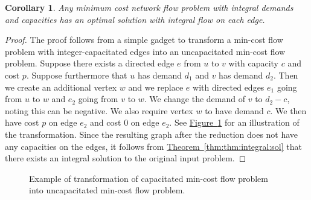 \documentclass[11pt]{article}
\newtheorem{corollary}[theorem]{Corollary}
\newcommand{\namedref}[2]{\hyperref[#2]{#1~\ref*{#2}}}
\newcommand{\thmref}[1]{\namedref{Theorem}{thm:#1}}
\newcommand{\corlab}[1]{\label{cor:#1}}
\newcommand{\figlab}[1]{\label{fig:#1}}
\newcommand{\figref}[1]{\namedref{Figure}{fig:#1}}
\begin{document}
\begin{corollary}
\corlab{cor:integral:sol}
Any minimum cost network flow problem with integral demands and capacities has an optimal solution with integral flow on each edge. 
\end{corollary}
\begin{proof}
The proof follows from a simple gadget to transform a min-cost flow problem with integer-capacitated edges into an uncapacitated min-cost flow problem. 
Suppose there exists a directed edge $e$ from $u$ to $v$ with capacity $c$ and cost $p$. 
Suppose furthermore that $u$ has demand $d_1$ and $v$ has demand $d_2$. 
Then we create an additional vertex $w$ and we replace $e$ with directed edges $e_1$ going from $u$ to $w$ and $e_2$ going from $v$ to $w$. 
We change the demand of $v$ to $d_2-c$, noting this can be negative. 
We also require vertex $w$ to have demand $c$. 
We then have cost $p$ on edge $e_2$ and cost $0$ on edge $e_2$. 
See \figref{fig:min:cost:transform} for an illustration of the transformation. 
Since the resulting graph after the reduction does not have any capacities on the edges, it follows from \thmref{thm:integral:sol} that there exists an integral solution to the original input problem. 
\end{proof}

\begin{figure}[!htb]
\centering
{}
\caption{Example of transformation of capacitated min-cost flow problem into uncapacitated min-cost flow problem.}
\figlab{fig:min:cost:transform}
\end{figure}
\end{document}

